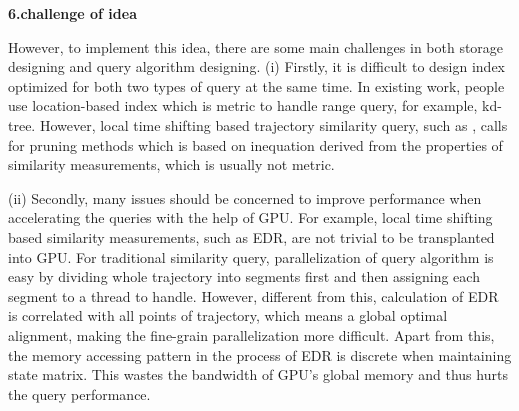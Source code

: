 \documentclass[conference]{IEEEtran}
\begin{document}
	
\textbf{6.challenge of idea}
	
	However, to implement this idea, there are some main challenges in both storage designing and query algorithm designing. (i) Firstly, it is difficult to design index optimized for both two types of query at the same time. In existing work, people use location-based index which is metric to handle range query, for example, kd-tree. However, local time shifting based trajectory similarity query, such as \cite{DBLP:conf/sigmod/ChenOO05}, calls for pruning methods which is based on inequation derived from the properties of similarity measurements, which is usually not metric.
	
	(ii) Secondly, many issues should be concerned to improve performance when accelerating the queries with the help of GPU. For example, local time shifting based similarity measurements, such as EDR, are not trivial to be transplanted into GPU. For traditional similarity query, parallelization of query algorithm is easy by dividing whole trajectory into segments first and then assigning each segment to a thread to handle. However, different from this, calculation of EDR is correlated with all points of trajectory, which means a global optimal alignment, making the fine-grain parallelization more difficult. Apart from this, the memory accessing pattern in the process of EDR is discrete when maintaining state matrix. This wastes the bandwidth of GPU's global memory and thus hurts the query performance. 
	
\end{document}
